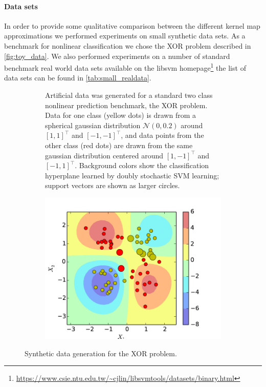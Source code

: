 \documentclass{article} %
\begin{document}
\paragraph{Data sets}
In order to provide some qualitative comparison between the different kernel map approximations we performed experiments on small synthetic data sets. As a benchmark for nonlinear classification we chose the XOR problem described in \autoref{fig:toy_data}. We also performed experiments on a number of standard benchmark real world data sets available on the libsvm homepage\footnote{\url{https://www.csie.ntu.edu.tw/~cjlin/libsvmtools/datasets/binary.html}} the list of data sets can be found in \autoref{tab:small_realdata}. 
%
\begin{figure}[!ht]
    \centering
           \hfill
        \begin{subfigure}[b]{0.5\textwidth}
         Artificial data was generated for a standard two class nonlinear prediction benchmark, the XOR problem.
        Data for one class (yellow dots) is drawn from a spherical gaussian distribution $\mathcal{N}(0,0.2)$ around $[1,1]^\top$ and $[-1,-1]^\top$, and data points from the other class (red dots) are drawn from the same gaussian distribution centered around $[1,-1]^\top$ and $[-1,1]^\top$. 
         Background colors show the classification hyperplane learned by doubly stochastic SVM learning; support vectors are shown as larger circles.\\     
        \end{subfigure}
	\hfill
         \begin{subfigure}[b]{0.4\textwidth}
         \centering
        \includegraphics[width=1\columnwidth]{imgs/svm_kernel}
               \label{fig:toy_data}
        \end{subfigure}

        \caption{\label{fig:toy_data} Synthetic data generation for the XOR problem.}
\end{figure}
\end{document}
